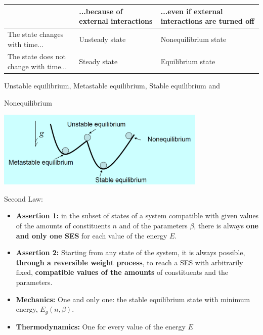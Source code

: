 \begin{minipage}{0.85\textwidth}
    \centering
    \begin{tabular}{|p{4cm}<{\centering}|p{4cm}<{\centering}|p{5cm}<{\centering}|}
        \hline
            ~ & ...because of external interactions & ...even if external interactions are turned off \\ 
        \hline
            The state changes with time... & Unsteady state  & Nonequilibrium state \\
        \hline
            The state does not change with time... & Steady state  & Equilibrium state \\ 
        \hline
    \end{tabular}
\end{minipage}
\begin{defn}
    Unstable equilibrium,
    Metastable equilibrium,
Stable equilibrium and

Nonequilibrium
    \par\indent
\begin{minipage}{0.8\textwidth}
    \centering
    \includegraphics[width=0.75\textwidth]{chap1/1.1.png}
\end{minipage}
\end{defn}
\begin{law}
    Second Law:

\begin{itemize}
\item \textbf{Assertion 1:} in the subset of states of a system compatible with 
given values of the amounts of constituents \( n \) and of the parameters \( \beta \), 
there is always \textbf{one and only one SES} for each value of the energy \( E \).  
\item \textbf{Assertion 2:} Starting from any state of the system, it is always possible, 
\textbf{through a reversible weight process}, to reach a SES with arbitrarily fixed, 
\textbf{compatible values of the amounts} of constituents and the parameters.
\end{itemize}
\begin{zhu}
    \par\indent
    \begin{itemize}
    \item \textbf{Mechanics:} One and only one: the stable equilibrium state with minimum energy, \( E_g (n, \beta) \). 
    \item \textbf{Thermodynamics:} One for every value of the energy \( E \)
\end{itemize}
\end{zhu}
\end{law}
